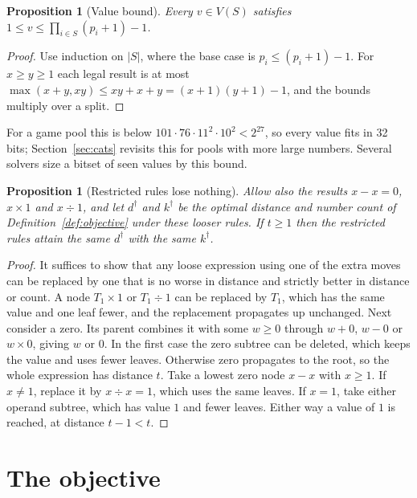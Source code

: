\documentclass[11pt,a4paper]{article}
\newtheorem{proposition}[theorem]{Proposition}
\theoremstyle{definition}
\theoremstyle{remark}
\begin{document}
\begin{proposition}[Value bound]\label{prop:bound}
Every $v \in V(S)$ satisfies $1 \le v \le \prod_{i \in S} (p_i + 1) - 1$.
\end{proposition}

\begin{proof}
Use induction on $|S|$, where the base case is $p_i \le (p_i + 1) - 1$. For $x \ge y \ge 1$ each legal result is
at most $\max(x + y, x y) \le x y + x + y = (x + 1)(y + 1) - 1$, and the bounds multiply over a split.
\end{proof}

For a game pool this is below $101 \cdot 76 \cdot 11^2 \cdot 10^2 < 2^{27}$, so every value fits in 32 bits; Section~\ref{sec:cats} revisits this for pools with more large numbers.
Several solvers size a bitset of seen values by this bound.

\begin{proposition}[Restricted rules lose nothing]\label{prop:restriction}
Allow also the results $x - x = 0$, $x \times 1$ and $x \div 1$, and let $d^\dagger$ and $k^\dagger$ be the
optimal distance and number count of Definition~\ref{def:objective} under these looser rules. If $t \ge 1$
then the restricted rules attain the same $d^\dagger$ with the same $k^\dagger$.
\end{proposition}

\begin{proof}
It suffices to show that any loose expression using one of the extra moves can be replaced by one that is
no worse in distance and strictly better in distance or count. A node $T_1 \times 1$ or $T_1 \div 1$ can be
replaced by $T_1$, which has the same value and one leaf fewer, and the replacement propagates up
unchanged. Next consider a zero. Its parent combines it with some $w \ge 0$ through $w + 0$, $w - 0$ or
$w \times 0$, giving $w$ or $0$. In the first case the zero subtree can be deleted, which keeps the value and
uses fewer leaves. Otherwise zero propagates to the root, so the whole expression has distance $t$. Take a
lowest zero node $x - x$ with $x \ge 1$. If $x \ne 1$, replace it by $x \div x = 1$, which uses the same
leaves. If $x = 1$, take either operand subtree, which has value $1$ and fewer leaves. Either way a value of
$1$ is reached, at distance $t - 1 < t$.
\end{proof}

\section{The objective}\label{sec:objective}
\end{document}
